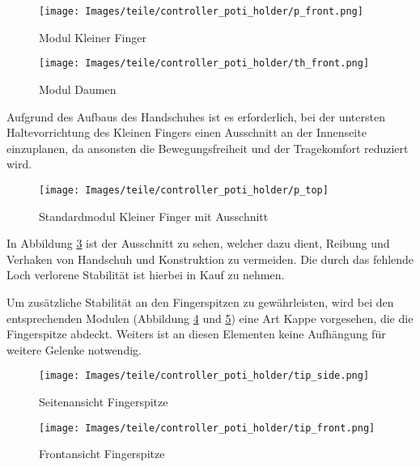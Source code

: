 \begin{minipage}{0.5\textwidth}
    \begin{figure}[H]
        \texttt{[image: Images/teile/controller\_poti\_holder/p\_front.png]}
        \centering
        \caption{Modul Kleiner Finger}
        \label{cph_p}
    \end{figure}
\end{minipage}
\begin{minipage}{0.5\textwidth}
    \begin{figure}[H]
        \texttt{[image: Images/teile/controller\_poti\_holder/th\_front.png]}
        \centering
        \caption{Modul Daumen}
        \label{cph_th}
    \end{figure}
\end{minipage}
\vspace{3mm}

Aufgrund des Aufbaus des Handschuhes ist es erforderlich, bei der untersten Haltevorrichtung des Kleinen Fingers einen Ausschnitt an der 
Innenseite einzuplanen, da ansonsten die Bewegungsfreiheit und der Tragekomfort reduziert wird.

\begin{minipage}{0.5\textwidth}
    \begin{figure}[H]
        \texttt{[image: Images/teile/controller\_poti\_holder/p\_top]}
        \centering
        \caption{Standardmodul Kleiner Finger mit Ausschnitt}
        \label{cut}
    \end{figure}
\end{minipage}
\begin{minipage}{0.5\textwidth}
    In Abbildung \ref{cut} ist der Ausschnitt zu sehen, welcher dazu dient, Reibung und Verhaken von 
    Handschuh und Konstruktion zu vermeiden. Die durch das fehlende Loch verlorene Stabilität 
    ist hierbei in Kauf zu nehmen. 
    
\end{minipage}

\pagebreak

Um zusätzliche Stabilität an den Fingerspitzen zu gewährleisten, wird bei den entsprechenden Modulen (Abbildung \ref{cpf-side} und \ref{cpf-front})
eine Art Kappe vorgesehen, die die Fingerspitze abdeckt. 
Weiters ist an diesen Elementen keine Aufhängung für weitere Gelenke notwendig. 

\begin{minipage}{0.5\textwidth}
    \begin{figure}[H]
        \texttt{[image: Images/teile/controller\_poti\_holder/tip\_side.png]}
        \centering
        \caption{Seitenansicht Fingerspitze}
        \label{cpf-side}
    \end{figure}
\end{minipage}
\begin{minipage}{0.5\textwidth}
    \begin{figure}[H]
        \texttt{[image: Images/teile/controller\_poti\_holder/tip\_front.png]}
        \centering
        \caption{Frontansicht Fingerspitze}
        \label{cpf-front}
    \end{figure}
\end{minipage}

